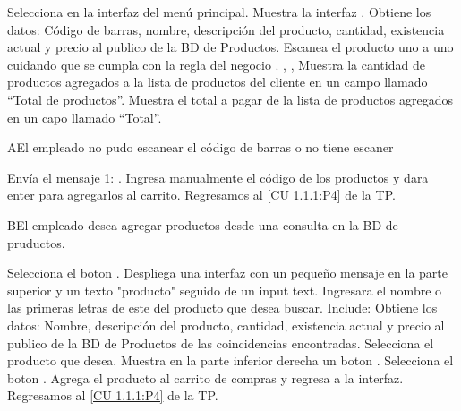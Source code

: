 \begin{UCtrayectoria}
		
	\UCpaso [\UCactor]Selecciona  en la interfaz del menú principal.
	\UCpaso [\UCsist]Muestra la interfaz .
	\UCpaso [\UCsist]Obtiene los datos: Código de barras, nombre, descripción del producto, cantidad, existencia actual y precio al publico de la BD de Productos.
	\UCpaso [\UCactor]Escanea el producto uno a uno cuidando que se cumpla con la regla del negocio . , , \label{CU 		1.1.1:P4}
	\UCpaso [\UCsist]Muestra  la cantidad de productos agregados a la lista de productos del cliente en un campo llamado “Total de productos”. 
	\UCpaso [\UCsist]Muestra el total a pagar de la lista de productos agregados en un capo llamado “Total”.

	
\end{UCtrayectoria}



\begin{UCtrayectoriaA}{A}{El empleado no pudo escanear el código de barras o no tiene escaner}

	\UCpaso [\UCsist] Envía el mensaje 1: .
	\UCpaso [\UCactor] Ingresa manualmente el código de los productos y dara enter para agregarlos al carrito.
	\UCpaso [\UCsist]Regresamos al \ref{CU 1.1.1:P4} de la TP.
\end{UCtrayectoriaA}


\begin{UCtrayectoriaA}{B}{El empleado desea agregar productos desde una consulta en la BD de pruductos.}

	\UCpaso [\UCactor]Selecciona el boton .
	\UCpaso [\UCsist]Despliega una interfaz con un pequeño mensaje  en la parte superior y un texto "producto" seguido de un 		input text.
	\UCpaso [\UCactor]Ingresara el nombre o las primeras letras de este del producto que desea buscar.
	\UCpaso [\UCsist] Include: Obtiene los datos: Nombre, descripción del producto, cantidad, existencia actual y precio al publico de la BD de 		Productos de las coincidencias encontradas.
	\UCpaso [\UCactor]Selecciona el producto que desea.
	\UCpaso [\UCsist]Muestra en la parte inferior derecha un boton .
	\UCpaso [\UCactor]Selecciona el boton .
	\UCpaso [\UCsist]Agrega el producto al carrito de compras y regresa a la interfaz.
	\UCpaso [\UCsist]Regresamos al \ref{CU 1.1.1:P4} de la TP.

\end{UCtrayectoriaA}

